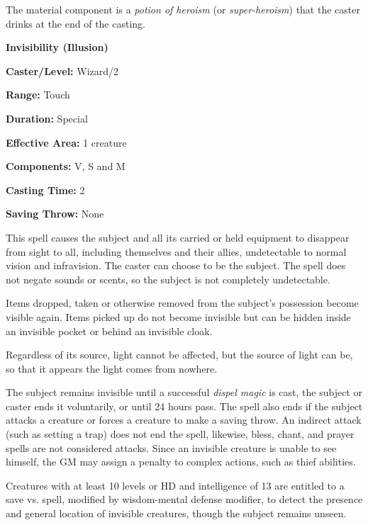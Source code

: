 \begin{multicols}{2}
The material component is a \textit{potion of heroism} (or \textit{super-heroism}) that the caster drinks at the end of the casting.

\vspace{1em}

\noindent
\begin{minipage}{\columnwidth}

\noindent \textbf{Invisibility (Illusion)}

\noindent \textbf{Caster/Level:} Wizard/2

\noindent \textbf{Range:} Touch

\noindent \textbf{Duration:} Special

\noindent \textbf{Effective Area:} 1 creature

\noindent \textbf{Components:} V, S and M

\noindent \textbf{Casting Time:} 2

\noindent \textbf{Saving Throw:} None

\end{minipage}

This spell causes the subject and all its carried or held equipment to disappear from sight to all, including themselves and their allies, undetectable to normal vision and infravision.  The caster can choose to be the subject.  The spell does not negate sounds or scents, so the subject is not completely undetectable. 

Items dropped, taken or otherwise removed from the subject's possession become visible again.  Items picked up do not become invisible but can be hidden inside an invisible pocket or behind an invisible cloak.  

Regardless of its source, light cannot be affected, but the source of light can be, so that it appears the light comes from nowhere.

The subject remains invisible until a successful \textit{dispel magic} is cast, the subject or caster ends it voluntarily, or until 24 hours pass.  The spell also ends if the subject attacks a creature or forces a creature to make a saving throw.  An indirect attack (such as setting a trap) does not end the spell, likewise, bless, chant, and prayer spells are not considered attacks.  Since an invisible creature is unable to see himself, the GM may assign a penalty to complex actions, such as thief abilities.

Creatures with at least 10 levels or HD and intelligence of 13 are entitled to a save vs. spell, modified by wisdom-mental defense modifier, to detect the presence and general location of invisible creatures, though the subject remains unseen.


\end{multicols}

